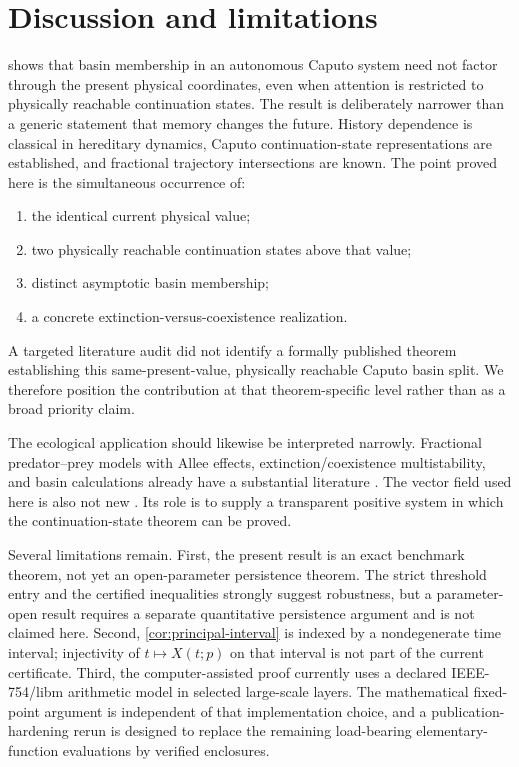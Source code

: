 \section{Discussion and limitations}
\label{sec:discussion}

 shows that basin membership in an autonomous Caputo system need not factor through the present physical coordinates, even when attention is restricted to physically reachable continuation states. The result is deliberately narrower than a generic statement that memory changes the future. History dependence is classical in hereditary dynamics, Caputo continuation-state representations are established, and fractional trajectory intersections are known. The point proved here is the simultaneous occurrence of:
\begin{enumerate}[label=(\roman*)]
  \item the identical current physical value;
  \item two physically reachable continuation states above that value;
  \item distinct asymptotic basin membership;
  \item a concrete extinction-versus-coexistence realization.
\end{enumerate}

A targeted literature audit did not identify a formally published theorem establishing this same-present-value, physically reachable Caputo basin split. We therefore position the contribution at that theorem-specific level rather than as a broad priority claim.

The ecological application should likewise be interpreted narrowly. Fractional predator--prey models with Allee effects, extinction/coexistence multistability, and basin calculations already have a substantial literature
\cite{RameshEtAl2025MemoryDoubleAllee,MondalEtAl2025Consequences,WangHan2025Allee,SahaEtAl2026AlleeBasin,PippalSati2026}. The vector field used here is also not new
\cite{YeEtAl2019StrongAlleePredatorPrey}. Its role is to supply a transparent positive system in which the continuation-state theorem can be proved.

Several limitations remain. First, the present result is an exact benchmark theorem, not yet an open-parameter persistence theorem. The strict threshold entry and the certified inequalities strongly suggest robustness, but a parameter-open result requires a separate quantitative persistence argument and is not claimed here. Second, \cref{cor:principal-interval} is indexed by a nondegenerate time interval; injectivity of \(t\mapsto X(t;p)\) on that interval is not part of the current certificate. Third, the computer-assisted proof currently uses a declared IEEE-754/libm arithmetic model in selected large-scale layers. The mathematical fixed-point argument is independent of that implementation choice, and a publication-hardening rerun is designed to replace the remaining load-bearing elementary-function evaluations by verified enclosures.

